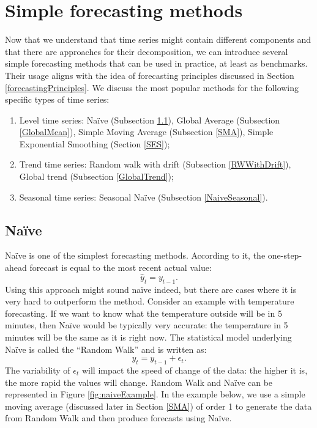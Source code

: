 \documentclass[
]{book}
\providecommand{\tightlist}{%
  \setlength{\itemsep}{0pt}\setlength{\parskip}{0pt}}
\theoremstyle{definition}
\theoremstyle{definition}
\theoremstyle{definition}
\theoremstyle{definition}
\theoremstyle{remark}
\begin{document}
\hypertarget{simpleForecastingMethods}{%
\section{Simple forecasting methods}\label{simpleForecastingMethods}}

Now that we understand that time series might contain different components and that there are approaches for their decomposition, we can introduce several simple forecasting methods that can be used in practice, at least as benchmarks. Their usage aligns with the idea of forecasting principles discussed in Section \ref{forecastingPrinciples}. We discuss the most popular methods for the following specific types of time series:

\begin{enumerate}
\def\labelenumi{\arabic{enumi}.}
\tightlist
\item
  Level time series: Naïve (Subsection \ref{Naive}), Global Average (Subsection \ref{GlobalMean}), Simple Moving Average (Subsection \ref{SMA}), Simple Exponential Smoothing (Section \ref{SES});
\item
  Trend time series: Random walk with drift (Subsection \ref{RWWithDrift}), Global trend (Subsection \ref{GlobalTrend});
\item
  Seasonal time series: Seasonal Naïve (Subsection \ref{NaiveSeasonal}).
\end{enumerate}

\hypertarget{Naive}{%
\subsection{Naïve}\label{Naive}}

Naïve is one of the simplest forecasting methods. According to it, the one-step-ahead forecast is equal to the most recent actual value:
\begin{equation}
    \hat{y}_t = y_{t-1} .
    \label{eq:Naive}
\end{equation}
Using this approach might sound naïve indeed, but there are cases where it is very hard to outperform the method. Consider an example with temperature forecasting. If we want to know what the temperature outside will be in 5 minutes, then Naïve would be typically very accurate: the temperature in 5 minutes will be the same as it is right now. The statistical model underlying Naïve is called the ``Random Walk'' and is written as:
\begin{equation}
    y_t = y_{t-1} + \epsilon_t.
    \label{eq:RandomWalk}
\end{equation}
The variability of \(\epsilon_t\) will impact the speed of change of the data: the higher it is, the more rapid the values will change. Random Walk and Naïve can be represented in Figure \ref{fig:naiveExample}. In the example below, we use a simple moving average (discussed later in Section \ref{SMA}) of order 1 to generate the data from Random Walk and then produce forecasts using Naïve.
\end{document}
